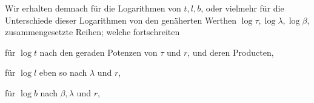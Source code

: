 \indent Wir erhalten demnach für die Logarithmen von \(t,l,b\), oder vielmehr für die Unterschiede dieser Logarithmen von den genäherten Werthen \(\log\tau,\log\lambda,\log\beta\), zusammengesetzte Reihen; welche fortschreiten
\begin{list}{}{\setlength{\leftmargin}{1.4em}\setlength{\itemindent}{0pt}\setlength{\itemsep}{0pt}\setlength{\parsep}{0pt}}
\item für \(\log t\) nach den geraden Potenzen von \(\tau\) und \(r\), und deren Producten,
\item für \(\log l\) eben so nach \(\lambda\) und \(r\),
\item für \(\log b\) nach \(\beta,\lambda\) und \(r\),
\end{list}
